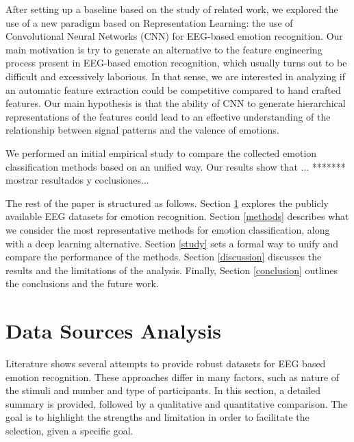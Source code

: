 \documentclass{sig-alternate}
\begin{document}
After setting up a baseline based on the study of related 
work, we explored the use of a new paradigm  based on 
Representation Learning: the use of Convolutional Neural 
Networks (CNN) for  EEG-based emotion recognition.  Our main
motivation is try to generate an alternative to the feature 
engineering process present in EEG-based emotion recognition, 
which usually turns out to be difficult and  excessively laborious. In 
that sense, we are interested in analyzing if an automatic feature 
extraction could be competitive compared to hand crafted 
features. Our main hypothesis is that  the ability of CNN to generate 
hierarchical representations of the features could lead to an 
effective understanding of the relationship between signal patterns 
and the valence of emotions.

We performed an initial empirical study to compare the collected 
emotion classification methods based on an unified way.  Our results 
show that ... ******* mostrar resultados y coclusiones...

The rest of the paper is structured as follows. Section \ref{data} 
explores the publicly  available EEG datasets for emotion 
recognition.  Section  \ref{methods} describes what we consider 
the most representative methods for emotion classification, along 
with a  deep learning alternative. Section \ref{study}
sets a formal way to unify and compare the performance of the 
methods. Section \ref{discussion} discusses the results and the 
limitations of the analysis. Finally, Section \ref{conclusion} outlines 
the conclusions and the future work. 

\section{Data Sources Analysis}
\label{data}

Literature shows several attempts  to provide robust datasets for EEG based 
emotion recognition. These approaches differ in many factors, such as  nature 
of the stimuli and number and type of participants. In this section,  a detailed 
summary is provided, followed by a qualitative and quantitative
comparison.  The goal is to highlight the strengths and limitation in order to 
facilitate the selection, given  a specific goal.
\end{document}
